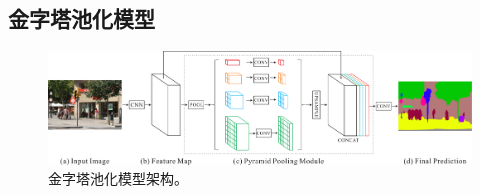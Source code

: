 \documentclass[lang=chs, degree=master, blindreview=false, adobe=false]{yanputhesis}
\begin{document}
\subsection{金字塔池化模型}
\begin{figure}[htb]
  \centering
  \includegraphics[scale=0.35]{images/PPM.png}
  \caption{
    金字塔池化模型架构\cite{zhao2017PPM}。
  }
  \label{fig:PPMfram}
\end{figure}
\end{document}
